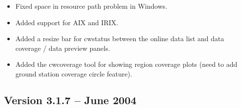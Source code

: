 \begin{itemize}

  \item Fixed space in resource path problem in Windows.

  \item Added support for AIX and IRIX.

  \item Added a resize bar for cwstatus between the online data list
  and data coverage / data preview panels.

  \item Added the cwcoverage tool for showing region coverage plots
  (need to add ground station coverage circle feature).

\end{itemize}


\subsection*{Version 3.1.7 -- June 2004}

